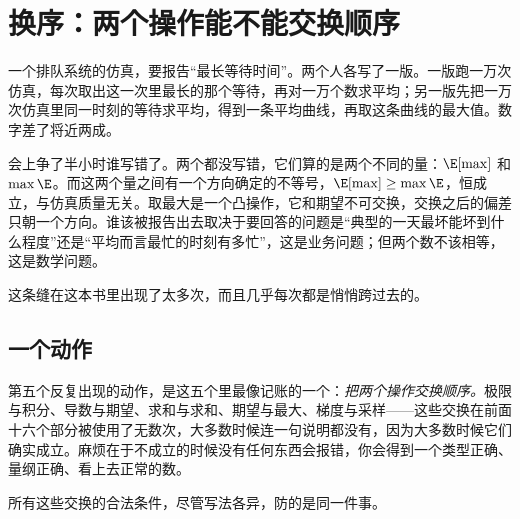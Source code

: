 \section{换序：两个操作能不能交换顺序}
\label{sec:17-Synthesis/02-Recurring-Ideas/05}

一个排队系统的仿真，要报告``最长等待时间''。两个人各写了一版。一版跑一万次仿真，每次取出这一次里最长的那个等待，再对一万个数求平均；另一版先把一万次仿真里同一时刻的等待求平均，得到一条平均曲线，再取这条曲线的最大值。数字差了将近两成。

会上争了半小时谁写错了。两个都没写错，它们算的是两个不同的量：\(\E[\max]\) 和 \(\max \E\)。而这两个量之间有一个方向确定的不等号，\(\E[\max]\ge\max\E\)，恒成立，与仿真质量无关。取最大是一个凸操作，它和期望不可交换，交换之后的偏差只朝一个方向。谁该被报告出去取决于要回答的问题是``典型的一天最坏能坏到什么程度''还是``平均而言最忙的时刻有多忙''，这是业务问题；但两个数不该相等，这是数学问题。

这条缝在这本书里出现了太多次，而且几乎每次都是悄悄跨过去的。

\subsection{一个动作}

第五个反复出现的动作，是这五个里最像记账的一个：\emph{把两个操作交换顺序。}极限与积分、导数与期望、求和与求和、期望与最大、梯度与采样——这些交换在前面十六个部分被使用了无数次，大多数时候连一句说明都没有，因为大多数时候它们确实成立。麻烦在于不成立的时候没有任何东西会报错，你会得到一个类型正确、量纲正确、看上去正常的数。

所有这些交换的合法条件，尽管写法各异，防的是同一件事。


